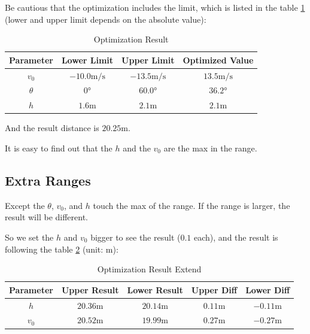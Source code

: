 \documentclass{article}
\begin{document}
Be cautious that the optimization includes the limit, which is listed in the table \ref{table:optimization-result} (lower and upper limit depends on the absolute value):

\begin{table}[H]
    \centering
    \begin{tabular}{cccc}
        \hline
        \textbf{Parameter} & \textbf{Lower Limit} & \textbf{Upper Limit} & \textbf{Optimized Value} \\
        \hline
        $v_0$ & $-10.0\si{\meter/\second}$ & $-13.5\si{\meter/\second}$ & $13.5\si{\meter/\second}$ \\
        $\theta$ & $0\si{\degree}$ & $60.0\si{\degree}$ & $36.2\si{\degree}$ \\
        $h$ & $1.6\si{\meter}$ & $2.1\si{\meter}$ & $2.1\si{\meter}$ \\
        \hline
    \end{tabular}
    \caption{Optimization Result}
    \label{table:optimization-result}
\end{table}

And the result distance is $20.25\si{\meter}$.

It is easy to find out that the $h$ and the $v_0$ are the max in the range.

\subsection{Extra Ranges}

Except the $\theta$, $v_0$, and $h$ touch the max of the range. If the range is larger, the result will be different.

So we set the $h$ and $v_0$ bigger to see the result ($0.1$ each), and the result is following the table \ref{table:optimization-result-extend} (unit: \si{\meter}):


\begin{table}[H]
    \centering
    \begin{tabular}{ccccc}
        \hline
        \textbf{Parameter} & \textbf{Upper Result} & \textbf{Lower Result} & \textbf{Upper Diff} & \textbf{Lower Diff} \\
        \hline
        $h$ & $20.36\si{\meter}$ & $20.14\si{\meter}$ & $0.11\si{\meter}$ & $-0.11\si{\meter}$ \\
        $v_0$ & $20.52\si{\meter}$ & $19.99\si{\meter}$ & $0.27\si{\meter}$ & $-0.27\si{\meter}$ \\
        \hline
    \end{tabular}
    \caption{Optimization Result Extend}
    \label{table:optimization-result-extend}
\end{table}
\end{document}
